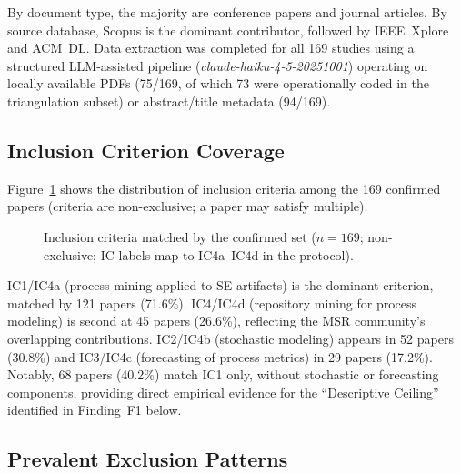 By document type, the majority are conference papers and journal articles.
By source database, Scopus is the dominant contributor, followed by
IEEE~Xplore and ACM~DL. Data extraction was completed for all 169 studies
using a structured LLM-assisted pipeline (\textit{claude-haiku-4-5-20251001})
operating on locally available PDFs (75/169, of which 73 were operationally
coded in the triangulation subset) or abstract/title metadata (94/169).

\subsection{Inclusion Criterion Coverage}

Figure~\ref{fig:ic-dist} shows the distribution of inclusion criteria among
the 169 confirmed papers (criteria are non-exclusive; a paper may satisfy
multiple).

\begin{figure}[htbp]
\centering
{}
\caption{Inclusion criteria matched by the confirmed set ($n = 169$;
  non-exclusive; IC labels map to IC4a--IC4d in the protocol).}
\label{fig:ic-dist}
\end{figure}

IC1/IC4a (process mining applied to SE artifacts) is the dominant criterion,
matched by 121 papers (71.6\%). IC4/IC4d (repository mining for process modeling)
is second at 45 papers (26.6\%), reflecting the MSR community's overlapping
contributions. IC2/IC4b (stochastic modeling) appears in 52 papers (30.8\%) and
IC3/IC4c (forecasting of process metrics) in 29 papers (17.2\%). Notably, 68
papers (40.2\%) match IC1 only, without stochastic or forecasting components,
providing direct empirical evidence for the ``Descriptive Ceiling'' identified
in Finding~F1 below.

\subsection{Prevalent Exclusion Patterns}

